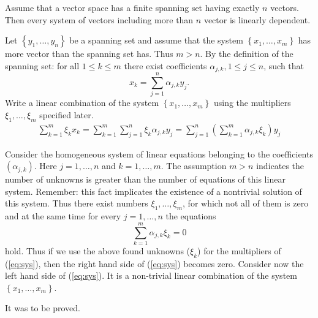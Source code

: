 \begin{frame}
\begin{lemma}[Steinitz]
    Assume that a vector space has a finite spanning set having exactly $n$ vectors.
    Then every system of vectors including more than $n$ vector is linearly dependent.
\end{lemma}
    Let $\left\{ y_1,\ldots,y_n \right\}$ be a spanning set
    and assume that the system  $\left\{ x_1,\ldots,x_m \right\}$ has more vector than the spanning set has.
    Thus $m>n$.
    By the definition of the spanning set: for all $1\leq k\leq m$ there exist coefficients 
    $\alpha_{j,k}, 1\leq j\leq n$, such that
    \[
        x_k=\sum_{j=1}^n\alpha_{j,k}y_j.
    \]
    Write a linear combination of the system $\left\{ x_1,\dots,x_m \right\}$ using the multipliers $\xi_1,\ldots,\xi_m$ specified later.
    \begin{eqnarray}
        \label{eq:sys}
        \sum_{k=1}^m\xi_kx_k=
        \sum_{k=1}^m\sum_{j=1}^n\xi_k\alpha_{j,k}y_j=
        \sum_{j=1}^n\left( \sum_{k=1}^m\alpha_{j,k}\xi_k \right)y_j
    \end{eqnarray}
\end{frame}
\begin{frame}
    Consider the homogeneous system of linear equations belonging to the coefficients $\left( \alpha_{j,k} \right)$.
    Here $j=1,\ldots,n$ and $k=1,\ldots,m$.
    The assumption $m>n$ indicates the number of unknowns is greater than the number of equations of this linear system.
    Remember: this fact implicates the existence of a nontrivial solution of this system.
    Thus there exist numbers $\xi_1,\ldots,\xi_m$, for which not all of them is zero
    and at the same time for every $j=1,\ldots,n$ the equations
    \[
        \sum_{k=1}^m\alpha_{j,k}\xi_k=0
    \]
    hold.
    Thus if we use the above found unknowns ($\xi_k$) for the multipliers of (\ref{eq:sys}), then the right hand side of (\ref{eq:sys}) becomes zero.
    Consider now the left hand side of (\ref{eq:sys}). 
    It is a non-trivial linear combination of the system $\left\{ x_1,\ldots,x_m \right\}$.

    It was to be proved.
\end{frame}

